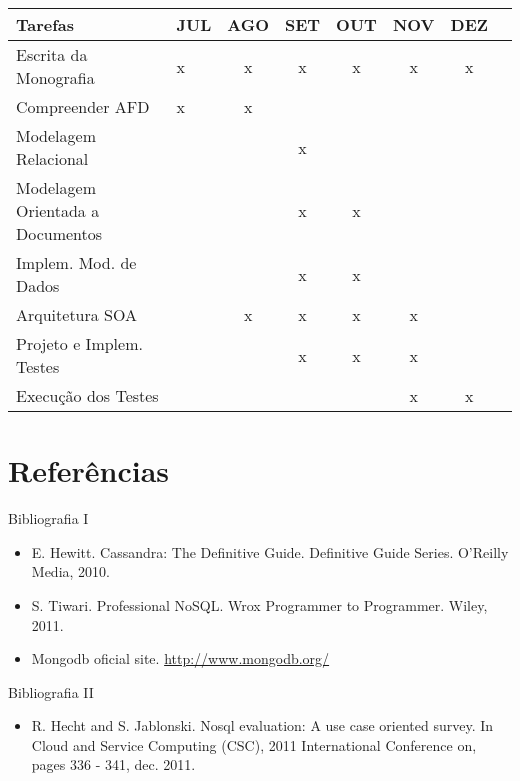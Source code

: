 \begin{frame}
\begin{changemargin}{-1cm}{-1cm} 
\begin{table}[h]
	\begin{center}
	\begin{tabular}{ p{4cm}lcccccc}
		\hline
			\textbf{Tarefas} & \textbf{JUL} & \textbf{AGO} & \textbf{SET} & \textbf{OUT} & \textbf{NOV} & \textbf{DEZ}\\
		\hline
			Escrita da Monografia & x & x & x & x & x & x\\
			Compreender AFD & x & x &  &  &  & \\
			Modelagem Relacional &  &  & x &  &  & \\
			Modelagem Orientada a  Documentos &  &  & x & x &  & \\
			Implem. Mod. de Dados &  &  & x & x &  & \\
			Arquitetura SOA &  & x & x & x & x & \\
			Projeto e Implem. Testes &  &  & x & x & x & \\
			Execução dos Testes &  &  &  &  & x & x\\
		\hline
	\end {tabular}
	\end{center}
\end{table}
\end{changemargin}
\end{frame}

\section{Referências}

\begin{frame}{Bibliografia I}
\begin{itemize}

\item E. Hewitt. Cassandra: The Definitive Guide. Definitive Guide Series. O'Reilly Media,
2010.

\item S. Tiwari. Professional NoSQL. Wrox Programmer to Programmer. Wiley, 2011.

\item Mongodb oficial site. \url{http://www.mongodb.org/}

\end{itemize}
\end{frame}

\begin{frame}{Bibliografia II}
\begin{itemize}

\item R. Hecht and S. Jablonski. Nosql evaluation: A use case oriented survey. In Cloud
and Service Computing (CSC), 2011 International Conference on, pages 336 - 341,
dec. 2011.
\end{itemize}
\end{frame}

